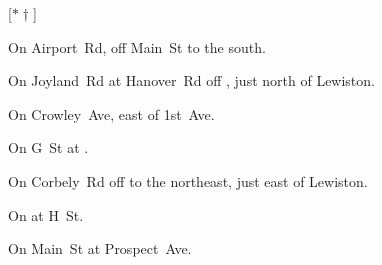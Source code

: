 
[$\ast\dagger$]

\begin{LocationList}

On Airport~Rd, off   Main~St to the south.

On Joyland~Rd at Hanover~Rd off , just north of Lewiston.

On Crowley~Ave, east of  1st~Ave.

On G~St at  .

On Corbely~Rd off  to the northeast, just east of Lewiston.

On   at H~St.

\Location{\TruckStop \Gas \Rest \Service}
On  Main~St at Prospect~Ave.

\end{LocationList}
